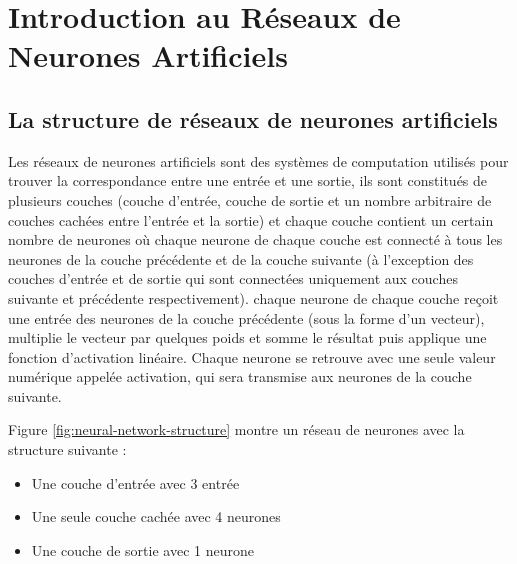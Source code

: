 \chapter{Introduction au Réseaux de Neurones Artificiels}


\section{La structure de réseaux de neurones artificiels}
Les réseaux de neurones artificiels sont des systèmes de computation utilisés pour trouver la correspondance entre une entrée et une sortie, ils sont constitués de plusieurs couches (couche d'entrée, couche de sortie et un nombre arbitraire de couches cachées entre l'entrée et la sortie) et chaque couche contient un certain nombre de neurones où chaque neurone de chaque couche est connecté à tous les neurones de la couche précédente et de la couche suivante (à l'exception des couches d'entrée et de sortie qui sont connectées uniquement aux couches suivante et précédente respectivement).
chaque neurone de chaque couche reçoit une entrée des neurones de la couche précédente (sous la forme d'un vecteur), multiplie le vecteur par quelques poids et somme le résultat puis applique une fonction d'activation linéaire. Chaque neurone se retrouve avec une seule valeur numérique appelée activation, qui sera transmise aux neurones de la couche suivante.

Figure \ref{fig:neural-network-structure} montre un réseau de neurones avec la structure suivante :

\begin{itemize}
    \item Une couche d'entrée avec 3 entrée
    \item Une seule couche cachée avec 4 neurones
    \item Une couche de sortie avec 1 neurone 
\end{itemize}

